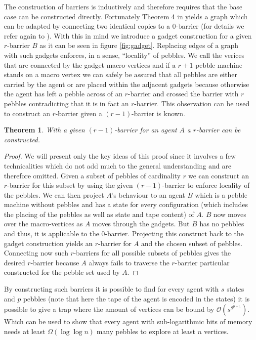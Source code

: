 \documentclass[draft,oneside]{scrartcl}
\newtheorem{thm}{Theorem}
\begin{document}
The construction of barriers is inductively and therefore requires that the
base case can be constructed directly. Fortunately Theorem 4 in \cite{0barrier}
yields a graph which can be adapted by connecting two identical copies to a
0-barrier (for details we refer again to \cite{pebbles}). With this in mind we
introduce a gadget construction for a given $r$-barrier $B$ as it can be seen
in figure \ref{fig:gadget}. Replacing edges of a graph with
such gadgets enforces, in a sense, \enquote{locality} of pebbles. We call
the verices that are connected by the gadget macro-vertices and if a $r+1$
pebble machine stands on a macro vertex we can safely be assured that all
pebbles are either carried by the agent or are placed within the adjacent
gadgets because otherwise the agent has left a pebble across of an $r$-barrier
and crossed the barrier with $r$ pebbles contradicting that it is in fact an
$r$-barrier. This observation can be used to construct an $r$-barrier given
a $(r-1)$-barrier is known.
\begin{thm}
  With a given $(r-1)$-barrier for an agent $A$ a $r$-barrier can be
  constructed.
\end{thm}
\begin{proof}
  We will present only the key ideas of this proof since it involves a
  few technicalities which do not add much to the general understanding
  and are therefore omitted. Given a subset of pebbles of cardinality $r$
  we can construct an $r$-barrier for this subset by using the given
  $(r-1)$-barrier to enforce locality of the pebbles. We can then project
  $A$'s behaviour to an agent $B$ which is a pebble machine without pebbles
  and has a state for every configuration (which includes the placing of the
  pebbles as well as state and tape content) of $A$. $B$ now moves over the
  macro-vertices as $A$ moves through the gadgets. But $B$ has no pebbles and
  thus, it is applicable to the 0-barrier. Projecting this construct back to
  the gadget construction yields an $r$-barrier for $A$ and the chosen subset
  of pebbles. Connecting now such $r$-barriers for all possible subsets of
  pebbles gives the desired $r$-barrier because $A$ always fails to traverse
  the $r$-barrier particular constructed for the pebble set used by $A$.
\end{proof}
By constructing such barriers it is possible to find for every agent
with $s$ states and $p$ pebbles (note that here the tape of the agent is
encoded in the states) it is possible to give a trap where the amount of
vertices can be bound by $\mathcal{O}(s^{8^{p+1}})$. Which can be used to
show that every agent with sub-logarithmic bits of memory needs at least
$\Omega(\log\log n)$ many pebbles to explore at least $n$ vertices.

\printbibliography
\end{document}
